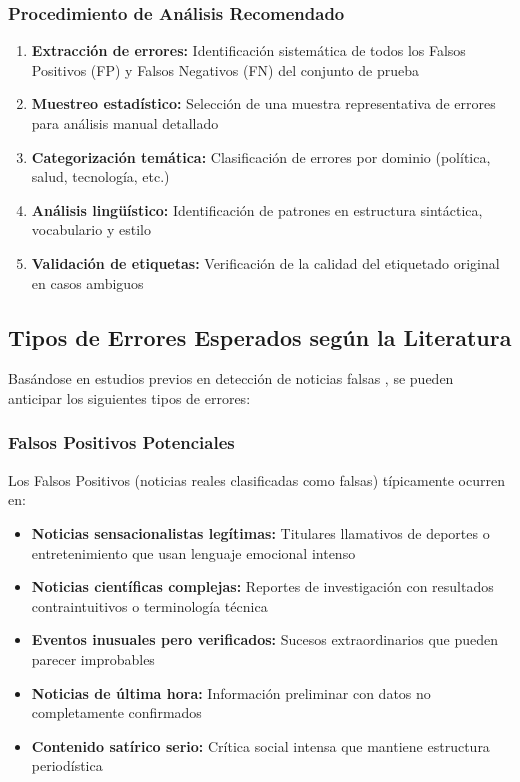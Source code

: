 \subsubsection{Procedimiento de Análisis Recomendado}

\begin{enumerate}
    \item \textbf{Extracción de errores:} Identificación sistemática de todos los Falsos Positivos (FP) y Falsos Negativos (FN) del conjunto de prueba
    \item \textbf{Muestreo estadístico:} Selección de una muestra representativa de errores para análisis manual detallado
    \item \textbf{Categorización temática:} Clasificación de errores por dominio (política, salud, tecnología, etc.)
    \item \textbf{Análisis lingüístico:} Identificación de patrones en estructura sintáctica, vocabulario y estilo
    \item \textbf{Validación de etiquetas:} Verificación de la calidad del etiquetado original en casos ambiguos
\end{enumerate}

\subsection{Tipos de Errores Esperados según la Literatura}

Basándose en estudios previos en detección de noticias falsas \cite{posadas2019detection, blanco2024enhancing}, se pueden anticipar los siguientes tipos de errores:

\subsubsection{Falsos Positivos Potenciales}

Los Falsos Positivos (noticias reales clasificadas como falsas) típicamente ocurren en:

\begin{itemize}
    \item \textbf{Noticias sensacionalistas legítimas:} Titulares llamativos de deportes o entretenimiento que usan lenguaje emocional intenso
    \item \textbf{Noticias científicas complejas:} Reportes de investigación con resultados contraintuitivos o terminología técnica
    \item \textbf{Eventos inusuales pero verificados:} Sucesos extraordinarios que pueden parecer improbables
    \item \textbf{Noticias de última hora:} Información preliminar con datos no completamente confirmados
    \item \textbf{Contenido satírico serio:} Crítica social intensa que mantiene estructura periodística
\end{itemize}

